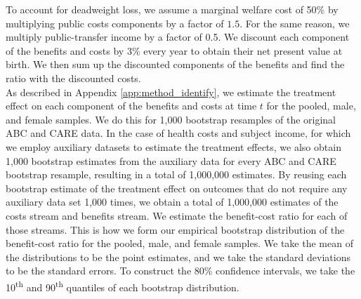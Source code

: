 \noindent To account for deadweight loss, we assume a marginal welfare cost of 50\% by multiplying
public costs components by a factor of $1.5$. For the same reason, we multiply public-transfer
income by a factor of 0.5. We discount each component of the benefits and costs
by 3\% every year to obtain their net present value at birth. We then sum up the discounted
components of the benefits and find the ratio with the discounted costs. \\

\noindent As described in Appendix \ref{app:method_identify}, we estimate the treatment effect on each
component of the benefits and costs at time $t$ for the pooled, male, and
female samples. We do this for 1,000 bootstrap resamples of the original ABC and CARE data.
In the case of health costs and subject income, for which we employ auxiliary datasets to
estimate the treatment effects, we also obtain 1,000 bootstrap estimates from the auxiliary data
for every ABC and CARE bootstrap resample, resulting in a total of 1,000,000 estimates.
By reusing each bootstrap estimate of the treatment effect on outcomes that do not require any auxiliary data
set 1,000 times, we obtain a total of 1,000,000 estimates of the costs stream and benefits stream.
We estimate the benefit-cost ratio for each of those streams.
This is how we form our empirical bootstrap distribution of the benefit-cost ratio for the pooled, male, and female samples.
We take the mean of the distributions to be the point estimates, and we take the standard deviations
to be the standard errors. To construct the 80\% confidence intervals, we take the 10\textsuperscript{th}
and 90\textsuperscript{th} quantiles of each bootstrap distribution.




